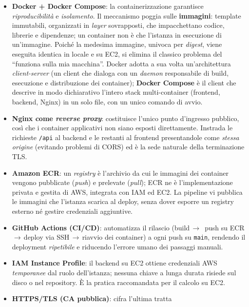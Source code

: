 \documentclass[11pt,a4paper]{article}
\begin{document}
\begin{itemize}[nosep]
  \item \textbf{Docker + Docker Compose}: la containerizzazione garantisce
        \emph{riproducibilità} e \emph{isolamento}. Il meccanismo poggia sulle
        \textbf{immagini}: template immutabili, organizzati in \emph{layer}
        sovrapposti, che impacchettano codice, librerie e dipendenze; un container non è
        che l'istanza in esecuzione di un'immagine. Poiché la medesima immagine, univoca
        per \emph{digest}, viene eseguita identica in locale e su EC2, si elimina il
        classico problema del ``funziona sulla mia macchina''. Docker adotta a sua volta
        un'architettura \emph{client-server} (un client che dialoga con un \emph{daemon}
        responsabile di build, esecuzione e distribuzione dei container); \textbf{Docker
        Compose} è il client che descrive in modo dichiarativo l'intero stack
        multi-container (frontend, backend, Nginx) in un solo file, con un unico comando
        di avvio.
  \item \textbf{Nginx come \emph{reverse proxy}}: costituisce l'unico punto d'ingresso
        pubblico, così che i container applicativi non siano esposti direttamente.
        Instrada le richieste \texttt{/api} al backend e le restanti al frontend
        presentandole come \emph{stessa origine} (evitando problemi di CORS) ed è la
        sede naturale della terminazione TLS.
  \item \textbf{Amazon ECR}: un \emph{registry} è l'archivio da cui le immagini dei
        container vengono pubblicate (\emph{push}) e prelevate (\emph{pull}); ECR ne è
        l'implementazione privata e gestita di AWS, integrata con IAM ed EC2. La
        pipeline vi pubblica le immagini che l'istanza scarica al deploy, senza dover
        esporre un registry esterno né gestire credenziali aggiuntive.
  \item \textbf{GitHub Actions (CI/CD)}: automatizza il rilascio (build\,$\rightarrow$\,
        push su ECR\,$\rightarrow$\,deploy via SSH\,$\rightarrow$\,riavvio dei
        container) a ogni push su \texttt{main}, rendendo il deployment
        \emph{ripetibile} e riducendo l'errore umano dei passaggi manuali.
  \item \textbf{IAM Instance Profile}: il backend su EC2 ottiene credenziali AWS
        \emph{temporanee} dal ruolo dell'istanza; nessuna chiave a lunga durata risiede
        sul disco o nel repository. È la pratica raccomandata per il calcolo su EC2.
  \item \textbf{HTTPS/TLS (CA pubblica)}: cifra l'ultima tratta

\end{itemize}
\end{document}
